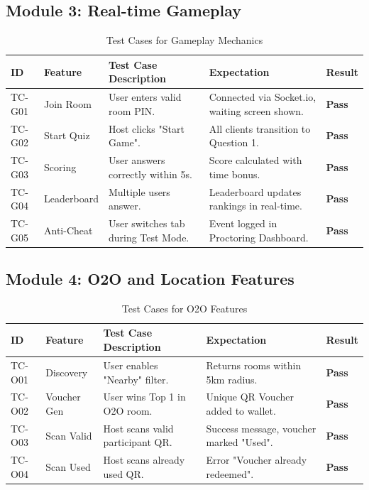 \subsection{Module 3: Real-time Gameplay}
\begin{table}[htbp]
\centering
\caption{Test Cases for Gameplay Mechanics}
\begin{tabular}{|l|l|p{4.5cm}|p{4.5cm}|l|}
\hline
\textbf{ID} & \textbf{Feature} & \textbf{Test Case Description} & \textbf{Expectation} & \textbf{Result} \\ \hline
TC-G01 & Join Room & User enters valid room PIN. & Connected via Socket.io, waiting screen shown. & \textbf{Pass} \\ \hline
TC-G02 & Start Quiz & Host clicks "Start Game". & All clients transition to Question 1. & \textbf{Pass} \\ \hline
TC-G03 & Scoring & User answers correctly within 5s. & Score calculated with time bonus. & \textbf{Pass} \\ \hline
TC-G04 & Leaderboard & Multiple users answer. & Leaderboard updates rankings in real-time. & \textbf{Pass} \\ \hline
TC-G05 & Anti-Cheat & User switches tab during Test Mode. & Event logged in Proctoring Dashboard. & \textbf{Pass} \\ \hline
\end{tabular}
\end{table}
\FloatBarrier

\subsection{Module 4: O2O and Location Features}
\begin{table}[htbp]
\centering
\caption{Test Cases for O2O Features}
\begin{tabular}{|l|l|p{4.5cm}|p{4.5cm}|l|}
\hline
\textbf{ID} & \textbf{Feature} & \textbf{Test Case Description} & \textbf{Expectation} & \textbf{Result} \\ \hline
TC-O01 & Discovery & User enables "Nearby" filter. & Returns rooms within 5km radius. & \textbf{Pass} \\ \hline
TC-O02 & Voucher Gen & User wins Top 1 in O2O room. & Unique QR Voucher added to wallet. & \textbf{Pass} \\ \hline
TC-O03 & Scan Valid & Host scans valid participant QR. & Success message, voucher marked "Used". & \textbf{Pass} \\ \hline
TC-O04 & Scan Used & Host scans already used QR. & Error "Voucher already redeemed". & \textbf{Pass} \\ \hline
\end{tabular}
\end{table}
\FloatBarrier

